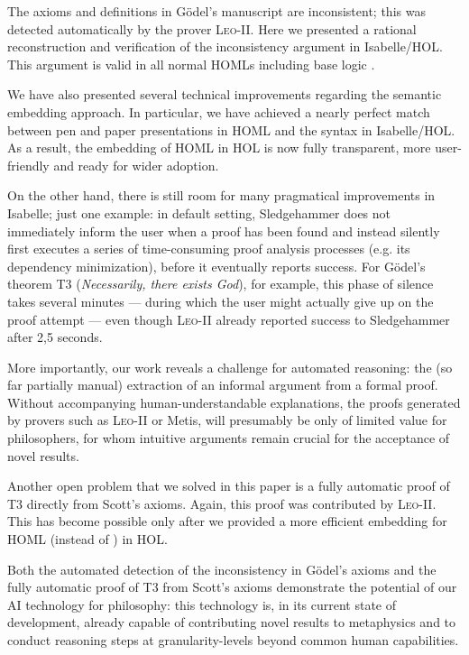 \documentclass{article}
\begin{document}
The axioms and definitions in G\"odel's manuscript are inconsistent;
this was detected automatically by the prover
\textsc{Leo-II}. Here we presented a rational reconstruction and
verification of the inconsistency argument in Isabelle/HOL. This
argument is valid in all normal HOMLs including base logic \K.

We have also presented several technical improvements regarding the
semantic embedding approach. In particular, we have achieved a
nearly perfect match between pen and paper presentations in HOML and
the syntax in Isabelle/HOL. As a result, the embedding of HOML in HOL
is now fully transparent, more user-friendly and ready for wider adoption.

On the other hand, there is still room for many pragmatical
improvements in Isabelle; just one example: in default setting,
Sledgehammer does not immediately inform the user when a proof has
been found and instead silently first executes a series of
time-consuming proof analysis processes (e.g. its dependency
minimization), before it eventually reports success. For G\"odel's
theorem T3 (\textit{Necessarily, there exists God}), for example, this
phase of silence takes several minutes --- during which the user might
actually give up on the proof attempt --- even though \textsc{Leo-II} already
reported success to Sledgehammer after 2,5 seconds.

More importantly, our work reveals a challenge for automated reasoning:
the (so far partially manual) extraction of an informal argument from a formal proof. 
Without accompanying human-understandable explanations,
the proofs generated by provers such as \textsc{Leo-II} or Metis, will
presumably be only of limited value for philosophers, for whom intuitive
arguments remain crucial for the acceptance of novel results.

Another open problem that we solved in this paper is a fully automatic
proof of T3 directly from Scott's axioms. Again, this proof was
contributed by \textsc{Leo-II}. This has become possible only
after we provided a more efficient embedding for HOML \SFiveU (instead of \SFive) in HOL.

Both the automated detection of the inconsistency in G\"odel's axioms
and the fully automatic proof of T3 from Scott's axioms demonstrate
the potential of our AI technology for philosophy: this technology is,
in its current state of development, already capable of contributing novel results to
metaphysics and to conduct reasoning steps at granularity-levels
beyond common human capabilities.  %
\end{document}
